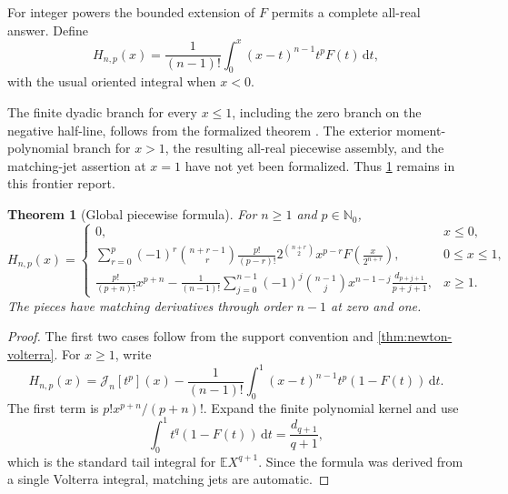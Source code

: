 \documentclass[11pt,oneside]{article}
\newtheorem{theorem}{Theorem}[section]
\theoremstyle{definition}
\theoremstyle{remark}
\newcommand{\E}{\mathbb E}
\newcommand{\N}{\mathbb N}
\newcommand{\dd}{\,\mathrm d}
\newcommand{\Jn}{\mathcal J}
\newcommand{\1}{\mathbf 1}
\begin{document}
For integer powers the bounded extension of \(F\) permits a complete all-real
answer.  Define
\begin{equation}
 H_{n,p}(x)=\frac1{(n-1)!}\int_0^x(x-t)^{n-1}t^pF(t)\dd t,       \label{eq:Hnp-def}
\end{equation}
with the usual oriented integral when \(x<0\).

\begin{warningbox}
The finite dyadic branch for every \(x\leq1\), including the zero branch on
the negative half-line, follows from the formalized theorem
.  The exterior
moment-polynomial branch for \(x>1\), the resulting all-real piecewise
assembly, and the matching-jet assertion at \(x=1\) have not yet been
formalized.  Thus \cref{thm:global-integer} remains in this frontier report.
\end{warningbox}

\begin{theorem}[Global piecewise formula]\label{thm:global-integer}
For \(n\geq1\) and \(p\in\N_0\),
\begin{equation}
 H_{n,p}(x)=
 \begin{cases}
  0, & x\leq0,\\[1mm]
  \displaystyle
  \sum_{r=0}^{p}(-1)^r\binom{n+r-1}{r}\frac{p!}{(p-r)!}
  2^{\binom{n+r}{2}}x^{p-r}
  F\!\left(\frac{x}{2^{n+r}}\right),
   & 0\leq x\leq1,\\[4mm]
  \displaystyle
  \frac{p!}{(p+n)!}x^{p+n}
  -\frac1{(n-1)!}\sum_{j=0}^{n-1}(-1)^j\binom{n-1}{j}
  x^{n-1-j}\frac{d_{p+j+1}}{p+j+1},
   & x\geq1.
 \end{cases}                                                    \label{eq:global-Hnp}
\end{equation}
The pieces have matching derivatives through order \(n-1\) at zero and one.
\end{theorem}

\begin{proof}
The first two cases follow from the support convention and
\cref{thm:newton-volterra}.  For \(x\geq1\), write
\[
 H_{n,p}(x)=\Jn_n[t^p](x)
 -\frac1{(n-1)!}\int_0^1(x-t)^{n-1}t^p(1-F(t))\dd t.
\]
The first term is \(p!x^{p+n}/(p+n)!\).  Expand the finite polynomial kernel
and use
\begin{equation}
 \int_0^1t^q(1-F(t))\dd t=\frac{d_{q+1}}{q+1},                 \label{eq:tail-moment}
\end{equation}
which is the standard tail integral for \(\E X^{q+1}\).  Since the formula
was derived from a single Volterra integral, matching jets are automatic.
\end{proof}
\end{document}
